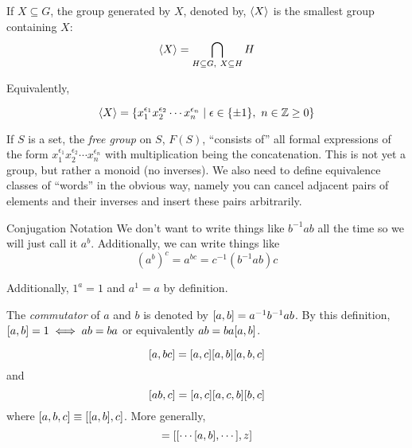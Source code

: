 \documentclass[a4paper,twoside,master.tex]{subfiles}
\begin{document}

If $ X \subseteq G $, the group generated by $ X $, denoted by, $ \ev{X} $ is the smallest group containing $ X $:
\begin{equation}
    \ev{X} = \bigcap_{H\subseteq G,\ X\subseteq H} H
\end{equation}

Equivalently,

\begin{equation}
    \ev{X} = \{x_1^{\epsilon_1} x_2^{\epsilon_2} \cdots x_n^{\epsilon_n} \mid \epsilon \in \{\pm 1\},\ n \in \Z \geq 0\}
\end{equation}

\begin{definition}
    If $ S $ is a set, the \textit{free group} on $ S $, $ F(S) $, ``consists of'' all formal expressions of the form $ x_1^{\epsilon_1} x_2^{\epsilon_2} \cdots x_n^{\epsilon_n} $ with multiplication being the concatenation. This is not yet a group, but rather a monoid (no inverses). We also need to define equivalence classes of ``words'' in the obvious way, namely you can cancel adjacent pairs of elements and their inverses and insert these pairs arbitrarily.
\end{definition}

\begin{note}{Conjugation Notation}
    We don't want to write things like $ b^{-1} a b $ all the time so we will just call it $ a^b $. Additionally, we can write things like
    \begin{equation}
        (a^b)^c = a^{b c} = c^{-1} (b^{-1} a b) c
    \end{equation}

    Additionally, $ 1^a = 1 $ and $ a^1 = a $ by definition.
\end{note}

\begin{definition}
    The \textit{commutator} of $ a $ and $ b $ is denoted by $ \comm{a}{b} = a^{-1} b^{-1} a b $. By this definition, $ \comm{a}{b} = 1 \iff ab = b a $ or equivalently $ ab = b a \comm{a}{b} $.
\end{definition}

\begin{equation}
    \comm{a}{b c} = \comm{a}{c} \comm{a}{b} [a,b,c]
\end{equation}
and
\begin{equation}
    \comm{ab}{c} = \comm{a}{c} [a,c,b] \comm{b}{c}
\end{equation}
where $ [a,b,c] \equiv \comm{\comm{a}{b}}{c} $. More generally,
\begin{equation}
    [a,b,c,\cdots,z] = [ [\cdots \comm{a}{b} ,\cdots],z]
\end{equation}
\end{document}
